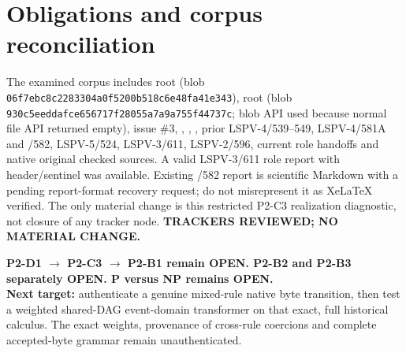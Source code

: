 \documentclass[11pt]{article}
\begin{document}
\section*{Obligations and corpus reconciliation}
The examined corpus includes root  (blob \texttt{06f7ebc8c2283304a0f5200b518c6e48fa41e343}), root  (blob \texttt{930c5eeddafce656717f28055a7a9a755f44737c}; blob API used because normal file API returned empty), issue \#3, , , , prior LSPV-4/539--549, LSPV-4/581A and /582, LSPV-5/524, LSPV-3/611, LSPV-2/596, current role handoffs and native original checked sources. A valid LSPV-3/611 role report with header/sentinel was available. Existing /582 report is scientific Markdown with a pending report-format recovery request; do not misrepresent it as XeLaTeX verified. The only material change is this restricted P2-C3 realization diagnostic, not closure of any tracker node. \textbf{TRACKERS REVIEWED; NO MATERIAL CHANGE.}

\noindent \textbf{P2-D1 $\longrightarrow$ P2-C3 $\longrightarrow$ P2-B1 remain OPEN. P2-B2 and P2-B3 separately OPEN. P versus NP remains OPEN.}\\
\textbf{Next target:} authenticate a genuine mixed-rule native byte transition, then test a weighted shared-DAG event-domain transformer on that exact, full historical calculus. The exact weights, provenance of cross-rule coercions and complete accepted-byte grammar remain unauthenticated.
\end{document}
